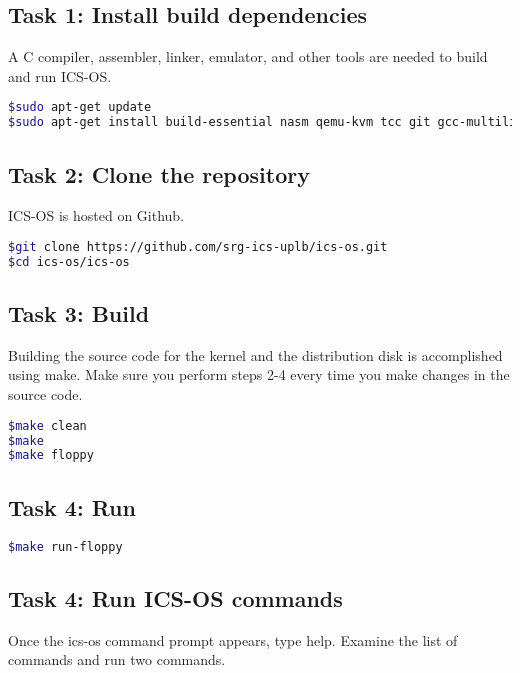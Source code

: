 \documentclass[a4paper, 11pt,oneside]{article}
\begin{document}
\subsection*{Task 1: Install build dependencies}
A C compiler, assembler, linker, emulator, and other tools are needed to 
build and run ICS-OS.

\begin{lstlisting}[language=bash,frame=single]
$sudo apt-get update
$sudo apt-get install build-essential nasm qemu-kvm tcc git gcc-multilib
\end{lstlisting}

\subsection*{Task 2: Clone the repository}
ICS-OS is hosted on Github.
\begin{lstlisting}[language=bash,frame=single] 
$git clone https://github.com/srg-ics-uplb/ics-os.git
$cd ics-os/ics-os
\end{lstlisting}

\subsection*{Task 3: Build}
Building the source code for the kernel and the distribution disk is accomplished using make. Make sure you perform steps 2-4 every time you make changes in the source code.
\begin{lstlisting}[language=bash,frame=single] 
$make clean
$make
$make floppy 
\end{lstlisting}

\subsection*{Task 4: Run}
\begin{lstlisting}[language=bash,frame=single] 
$make run-floppy 
\end{lstlisting}

\subsection*{Task 4: Run ICS-OS commands}
Once the ics-os command prompt appears, type help. 
Examine the list of commands and run two commands.

\end{document}
